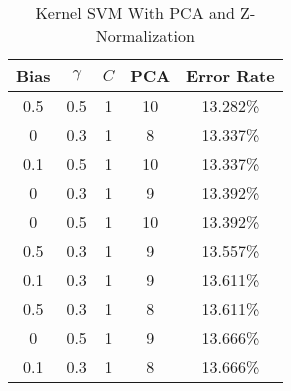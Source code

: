 \begin{center}
\begin{longtable}{|c|c|c|c|c|}
\caption{Kernel SVM With PCA and Z-Normalization}\label{tab:svm_rbfpcan_acctable}\\
\hline
Bias & $\gamma$ & $C$ & PCA & Error Rate \\
\hline
0.5 & 0.5 & 1 & 10 & 13.282\% \\
\hline
0 & 0.3 & 1 & 8 & 13.337\% \\
\hline
0.1 & 0.5 & 1 & 10 & 13.337\% \\
\hline
0 & 0.3 & 1 & 9 & 13.392\% \\
\hline
0 & 0.5 & 1 & 10 & 13.392\% \\
\hline
0.5 & 0.3 & 1 & 9 & 13.557\% \\
\hline
0.1 & 0.3 & 1 & 9 & 13.611\% \\
\hline
0.5 & 0.3 & 1 & 8 & 13.611\% \\
\hline
0 & 0.5 & 1 & 9 & 13.666\% \\
\hline
0.1 & 0.3 & 1 & 8 & 13.666\% \\
\hline
\end{longtable}
\end{center}
